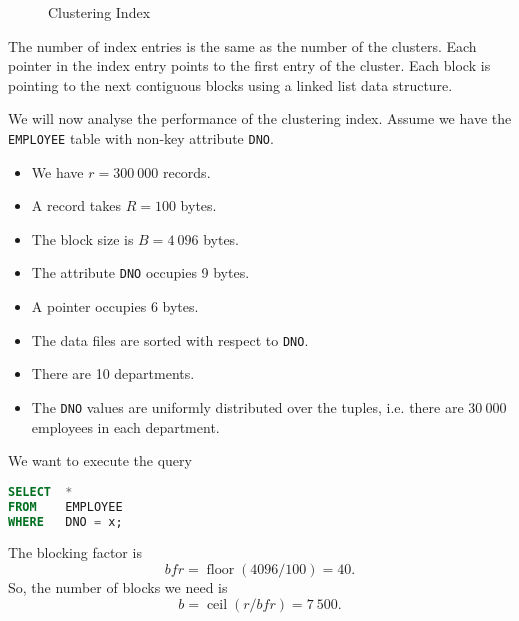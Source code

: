 \documentclass[a4paper, openany]{memoir}
\begin{document}
\begin{figure}[H]
    \caption{Clustering Index}
\end{figure}
\noindent The number of index entries is the same as the number of the clusters. Each pointer in the index entry points to the first entry of the cluster. Each block is pointing to the next contiguous blocks using a linked list data structure.

We will now analyse the performance of the clustering index. Assume we have the \texttt{EMPLOYEE} table with non-key attribute \texttt{DNO}.
\begin{itemize}
    \item We have $r = 300 \ 000$ records.
    \item A record takes $R = 100$ bytes.
    \item The block size is $B = 4 \ 096$ bytes.
    \item The attribute \texttt{DNO} occupies 9 bytes.
    \item A pointer occupies 6 bytes.
    \item The data files are sorted with respect to \texttt{DNO}.
    \item There are 10 departments.
    \item The \texttt{DNO} values are uniformly distributed over the tuples, i.e. there are $30 \ 000$ employees in each department.
\end{itemize}
We want to execute the query
\begin{lstlisting}[language=SQL]
SELECT  *
FROM    EMPLOYEE
WHERE   DNO = x;
\end{lstlisting}
The blocking factor is
\[\textit{bfr} = \operatorname{floor}(4096/100) = 40.\]
So, the number of blocks we need is
\[b = \operatorname{ceil}(r/\textit{bfr}) = 7 \ 500.\]
\end{document}

